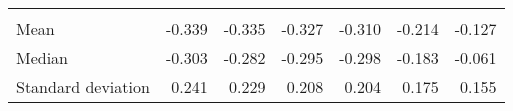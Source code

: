 \begin{tabular}{lllllll}
  \multicolumn{1}{r}{} &
  \multicolumn{1}{r}{} &
  \multicolumn{1}{r}{} &
  \multicolumn{1}{r}{} \\
\multicolumn{1}{l}{\hspace{1em}Mean} &
  \multicolumn{1}{|r}{-0.339} &
  \multicolumn{1}{r}{-0.335} &
  \multicolumn{1}{r}{-0.327} &
  \multicolumn{1}{r}{-0.310} &
  \multicolumn{1}{r}{-0.214} &
  \multicolumn{1}{r}{-0.127} \\
\multicolumn{1}{l}{\hspace{1em}Median} &
  \multicolumn{1}{|r}{-0.303} &
  \multicolumn{1}{r}{-0.282} &
  \multicolumn{1}{r}{-0.295} &
  \multicolumn{1}{r}{-0.298} &
  \multicolumn{1}{r}{-0.183} &
  \multicolumn{1}{r}{-0.061} \\
\multicolumn{1}{l}{\hspace{1em}Standard deviation} &
  \multicolumn{1}{|r}{0.241} &
  \multicolumn{1}{r}{0.229} &
  \multicolumn{1}{r}{0.208} &
  \multicolumn{1}{r}{0.204} &
  \multicolumn{1}{r}{0.175} &
  \multicolumn{1}{r}{0.155} \\
\cline{1-7}
\end{tabular}
